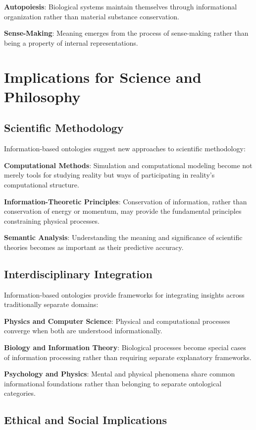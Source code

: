 \documentclass[12pt]{article}
\begin{document}
\textbf{Autopoiesis}: Biological systems maintain themselves through informational organization rather than material substance conservation.

\textbf{Sense-Making}: Meaning emerges from the process of sense-making rather than being a property of internal representations.

\section{Implications for Science and Philosophy}

\subsection{Scientific Methodology}

Information-based ontologies suggest new approaches to scientific methodology:

\textbf{Computational Methods}: Simulation and computational modeling become not merely tools for studying reality but ways of participating in reality's computational structure.

\textbf{Information-Theoretic Principles}: Conservation of information, rather than conservation of energy or momentum, may provide the fundamental principles constraining physical processes.

\textbf{Semantic Analysis}: Understanding the meaning and significance of scientific theories becomes as important as their predictive accuracy.

\subsection{Interdisciplinary Integration}

Information-based ontologies provide frameworks for integrating insights across traditionally separate domains:

\textbf{Physics and Computer Science}: Physical and computational processes converge when both are understood informationally.

\textbf{Biology and Information Theory}: Biological processes become special cases of information processing rather than requiring separate explanatory frameworks.

\textbf{Psychology and Physics}: Mental and physical phenomena share common informational foundations rather than belonging to separate ontological categories.

\subsection{Ethical and Social Implications}
\end{document}
